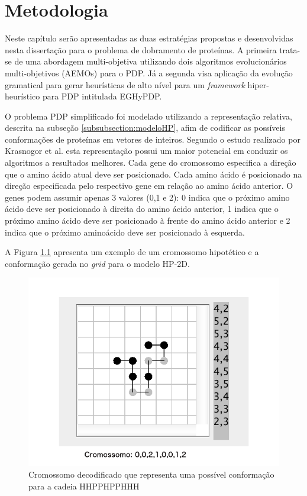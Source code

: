 \chapter{Metodologia}
\label{cap:Metodologia}

Neste capítulo serão apresentadas as duas estratégias propostas e desenvolvidas nesta dissertação para o problema de dobramento de proteínas. A primeira trata-se de uma abordagem multi-objetiva utilizando dois algoritmos evolucionários multi-objetivos (AEMOs) para o PDP. Já a segunda visa aplicação da evolução gramatical  para gerar heurísticas de alto nível para um \textit{framework} hiper-heurístico  para PDP intitulada EGHyPDP.


O problema PDP simplificado foi modelado utilizando a representação relativa, descrita na subseção \ref{subsubsection:modeloHP}, afim de codificar as possíveis conformações de proteínas em vetores de inteiros. Segundo o estudo realizado por Krasnogor et al. \cite{krasnogor1999protein} esta representação possui um maior potencial em conduzir os algoritmos a resultados melhores. Cada gene do cromossomo especifica a direção que o amino ácido atual deve ser posicionado. Cada amino ácido é posicionado na direção especificada pelo respectivo gene em relação ao amino ácido anterior. O genes podem assumir apenas 3 valores (0,1 e 2): 0 indica que o próximo amino ácido deve ser posicionado à direita do amino ácido anterior, 1 indica que o próximo amino ácido deve ser posicionado à frente do amino ácido anterior e 2 indica que o próximo aminoácido deve ser posicionado à esquerda. 

A Figura \ref{img:cromossomo} apresenta um exemplo de um cromossomo hipotético e a conformação gerada no \textit{grid} para o modelo HP-2D.


\begin{figure}[!htb]
	\centering
	\includegraphics[scale=0.36]{Imagens/DecodedCromossome.png}
	\caption{Cromossomo decodificado que representa uma possível conformação para a cadeia HHPPHPPHHH}
	\label{img:cromossomo}
\end{figure}



